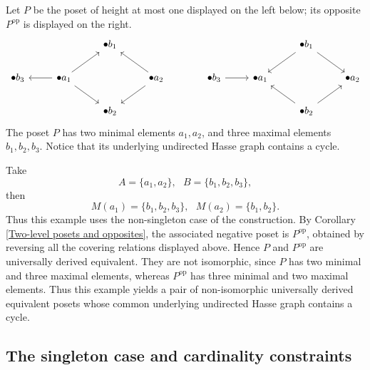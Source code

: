 \begin{example} \label{example two level posets}
Let $P$ be the poset of height at most one displayed on the left below; its opposite $P^{\operatorname{op}}$ is displayed on the right.
\[\begin{tikzcd}[sep=small]
	&&&& {\bullet b_1} &&&&&&&&& {\bullet b_1} && \\
	\\
	{\bullet b_3} && {\bullet a_1} &&&& {\bullet a_2} &&& {\bullet b_3} && {\bullet a_1} &&&& {\bullet a_2} \\
	\\
	&&&& {\bullet b_2} &&&&&&&&& {\bullet b_2}
	\arrow[from=1-14, to=3-12]
	\arrow[from=1-14, to=3-16]
	\arrow[from=3-3, to=1-5]
	\arrow[from=3-3, to=3-1]
	\arrow[from=3-3, to=5-5]
	\arrow[from=3-7, to=1-5]
	\arrow[from=3-7, to=5-5]
	\arrow[from=3-10, to=3-12]
	\arrow[from=5-14, to=3-12]
	\arrow[from=5-14, to=3-16]
\end{tikzcd}\]
The poset $P$ has two minimal elements $a_1,a_2$, and three maximal elements $b_1,b_2,b_3$. Notice that its underlying undirected Hasse graph contains a cycle. 

Take \[A=\{a_1,a_2\}, \,\,\,\, B=\{b_1,b_2,b_3\},\] then 
\[M(a_1)=\{b_1,b_2,b_3\}, \,\,\,\, M(a_2)=\{b_1,b_2\}.\] Thus this example uses the non-singleton case of the construction. 
By Corollary \ref{Two-level posets and opposites}, the associated negative poset is $P^{\operatorname{op}}$, obtained by reversing all the covering relations displayed above. Hence $P$ and $P^{\operatorname{op}}$ are universally derived equivalent. They are not isomorphic, since $P$ has two minimal and three maximal elements, whereas $P^{\operatorname{op}}$ has three minimal and two maximal elements.
Thus this example yields a pair of non-isomorphic universally derived equivalent posets whose common underlying undirected Hasse graph contains a cycle.
\end{example}

\subsection{The singleton case and cardinality constraints}
  
